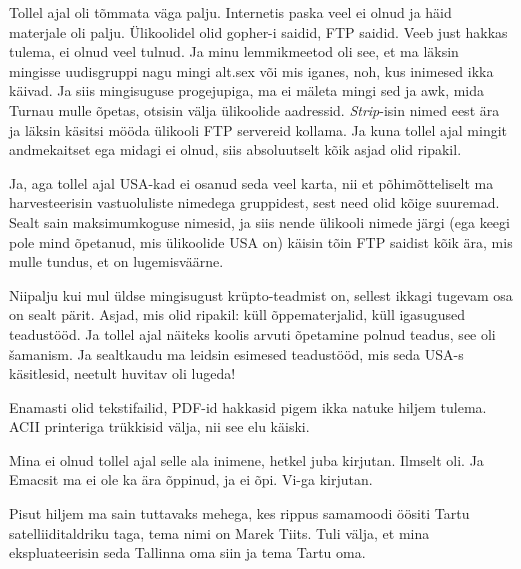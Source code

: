 
Tollel ajal oli tõmmata väga palju. Internetis paska veel ei olnud ja häid materjale oli palju. Ülikoolidel olid gopher-i saidid, FTP saidid. Veeb just hakkas tulema, ei olnud veel tulnud. Ja minu lemmikmeetod oli see, et ma läksin mingisse uudisgruppi nagu mingi alt.sex või mis iganes, noh, kus inimesed ikka käivad. Ja siis mingisuguse progejupiga, ma ei mäleta mingi sed ja awk, mida Turnau mulle õpetas, otsisin välja  ülikoolide aadressid. \emph{Strip}-isin nimed eest ära ja läksin käsitsi mööda ülikooli FTP servereid kollama. Ja kuna tollel ajal mingit andmekaitset ega midagi ei olnud, siis absoluutselt kõik asjad olid ripakil. 


Ja, aga tollel ajal USA-kad ei osanud seda veel karta, nii et põhimõtteliselt ma harvesteerisin vastuoluliste nimedega gruppidest, sest need olid kõige suuremad. Sealt sain maksimumkoguse nimesid, ja siis nende ülikooli nimede järgi (ega keegi pole mind õpetanud, mis ülikoolide USA on) käisin tõin FTP saidist kõik  ära, mis mulle tundus, et on lugemisväärne.


Niipalju kui mul üldse mingisugust krüpto-teadmist on, sellest ikkagi tugevam osa on sealt pärit. Asjad, mis olid ripakil: küll õppematerjalid, küll igasugused teadustööd. Ja tollel ajal näiteks koolis arvuti õpetamine polnud teadus, see oli šamanism. Ja sealtkaudu ma leidsin esimesed teadustööd, mis seda USA-s käsitlesid, neetult huvitav oli lugeda! 


Enamasti olid tekstifailid, PDF-id hakkasid pigem ikka natuke hiljem tulema. ACII printeriga trükkisid välja, nii see elu käiski. 


Mina ei olnud tollel ajal selle ala inimene, hetkel juba kirjutan. Ilmselt oli. Ja Emacsit ma ei ole ka ära õppinud, ja ei õpi. Vi-ga kirjutan. 

Pisut hiljem ma sain tuttavaks mehega, kes rippus samamoodi öösiti Tartu satelliiditaldriku taga, tema nimi on Marek Tiits. Tuli välja, et mina ekspluateerisin  seda Tallinna oma siin ja tema Tartu oma. 


